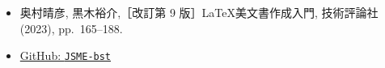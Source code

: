 \begin{tcolorbox}[title={第~\ref{ch:bibtex}~章の参考文献}, colback=yellow!5!white, colframe=yellow!75!black, coltitle=black]
    \begin{itemize}
        \item 奥村晴彦, 黒木裕介,［改訂第 9 版］\LaTeX 美文書作成入門, 技術評論社 (2023), pp.~165--188.
        \item \href{https://github.com/Yuki-MATSUKAWA/JSME-bst}{GitHub: \texttt{JSME-bst}}
    \end{itemize}
\end{tcolorbox}



